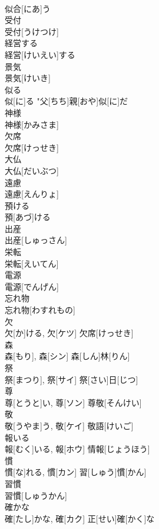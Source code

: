 \documentclass[8pt]{extreport}
\begin{document}
\begin{CJK}{UTF8}{min}
\\	似合[にあ]う	
\\	受付	
\\	受付[うけつけ]	
\\	経営する	
\\	経営[けいえい]する	
\\	景気	
\\	景気[けいき]	
\\	似る	
\\	似[に]る	"父[ちち]親[おや]似[に]だ 
\\	神様	
\\	神様[かみさま]	
\\	欠席	
\\	欠席[けっせき]	
\\	大仏	
\\	大仏[だいぶつ]	
\\	遠慮	
\\	遠慮[えんりょ]	
\\	預ける	
\\	預[あづ]ける	
\\	出産	
\\	出産[しゅっさん]	
\\	栄転	
\\	栄転[えいてん]	
\\	電源	
\\	電源[でんげん]	
\\	忘れ物	
\\	忘れ物[わすれもの]	
\\	欠	
\\	欠[か]ける, 欠[ケツ]	欠席[けっせき] 
\\	森	
\\	森[もり], 森[シン]	森[しん]林[りん]
\\	祭	
\\	祭[まつり], 祭[サイ]	祭[さい]日[じつ] 
\\	尊	
\\	尊[とうと]い, 尊[ソン]	尊敬[そんけい] 
\\	敬	
\\	敬[うやま]う, 敬[ケイ]	敬語[けいご] 
\\	報いる	
\\	報[むく]いる, 報[ホウ]	情報[じょうほう] 
\\	慣	
\\	慣[な]れる, 慣[カン]	習[しゅう]慣[かん] 
\\	習慣	
\\	習慣[しゅうかん]	
\\	確かな	
\\	確[たし]かな, 確[カク]	正[せい]確[かく]な 

\end{CJK}
\end{document}
